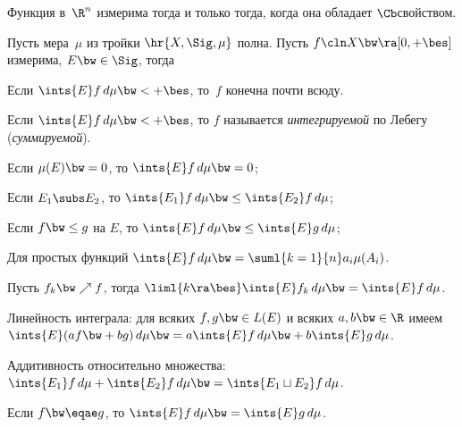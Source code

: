 \documentclass[a4paper,draft]{article}
\begin{document}
\begin{theorem}[Лузина]
  Функция в~$\R^n$ измерима тогда и только тогда, когда она обладает $\Cb$\д свойством.
\end{theorem}

\begin{df}
  Пусть мера~$\mu$ из тройки $\hr{X,\Sig,\mu}$ полна.
  Пусть $f\cln X\bw\ra [0,+\bes]$ измерима, $E \bw\in \Sig$, тогда
\end{df}

\begin{note}
  Если $\ints{E}f\,d\mu \bw< +\bes$, то~$f$ конечна почти всюду.
\end{note}

\begin{df}
  Если $\ints{E}f\,d\mu\bw<+\bes$, то $f$ называется
  \emph{интегрируемой} по Лебегу (\emph{суммируемой}).
\end{df}

\begin{stm}
  \begin{items}{-3}
    \item Если $\mu(E) \bw= 0$, то $\ints{E} f\,d\mu \bw=0$;
    \item Если $E_1\subs E_2$, то $\ints{E_1}f\,d\mu \bw\le \ints{E_2}f\,d\mu$;
    \item Если $f \bw\le g$ на $E$, то $\ints{E}f\,d\mu \bw\le \ints{E}g\,d\mu$;
    \item Для простых функций $\ints{E}f\,d\mu \bw= \suml{k=1}{n} a_i\mu(A_i)$.
  \end{items}
\end{stm}

\begin{theorem}
Пусть $f_k \bw\nearrow f$, тогда $\liml{k\ra\bes} \ints{E} f_k\,d\mu \bw= \ints{E}f\,d\mu$.
\end{theorem}

\begin{stm}
  \begin{items}{-3}
    \item Линейность интеграла: для всяких $f,g \bw\in L(E)$ и всяких $a,b \bw\in \R$
          имеем $\ints{E}(af \bw+ bg)\,d\mu \bw= a\ints{E}f\,d\mu \bw+ b\ints{E}g\,d\mu$.
    \item Аддитивность относительно множества:
          $\ints{E_1}f\,d\mu + \ints{E_2}f\,d\mu \bw= \ints{E_1\sqcup E_2}f\,d\mu$.
    \item Если $f\bw\eqae g$, то $\ints{E}f\,d\mu \bw= \ints{E}g\,d\mu$.
  \end{items}
\end{stm}
\end{document}
